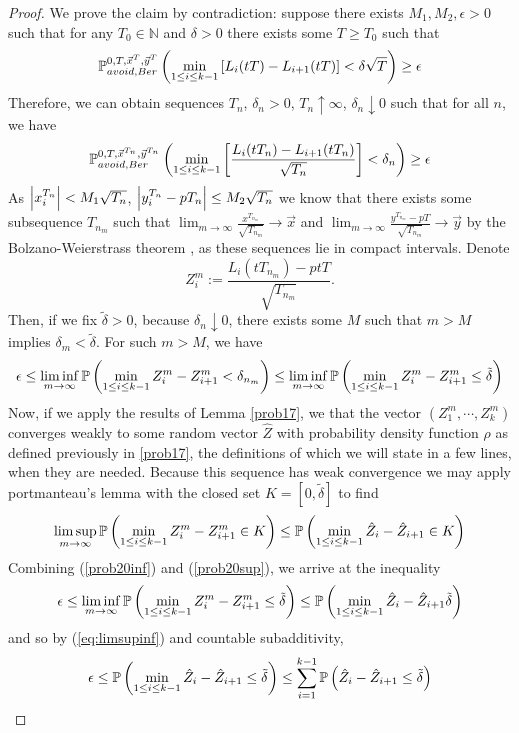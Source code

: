 \begin{proof}
	We prove the claim by contradiction:
	suppose there exists $M_1,M_2,\epsilon>0$ such that for any $T_0\in \mathbb{N}$ and $\delta>0$ there exists some $T\geq T_0$ such that \[
	\pr^{0,T,\vec x^T,\vec y^T}_{avoid, Ber}\left(\min_{1\leq i\leq k-1}\left[L_i(tT)-L_{i+1}(tT)\right]<\delta\sqrt{T}\right)\geq \epsilon
	\]
	Therefore, we can obtain sequences $T_n$, $\delta_n>0$, $T_n\uparrow \infty$, $\delta_n\downarrow 0$ such that for all $n$, we have  
	\[
	\pr^{0,T,\vec x^{T_n},\vec y^{T_n}}_{avoid, Ber}\left(\min_{1\leq i\leq k-1}\left[\frac{L_i(tT_n)-L_{i+1}(tT_n)}{\sqrt{T_n}}\right]<\delta_n\right)\geq \epsilon
	\]
	As $\abs*{x_i^{T_n}}<M_1\sqrt{T_n}$, $\abs*{y_i^{T_n}-pT_n}\leq M_2\sqrt{T_n}$ we know that there exists some subsequence $T_{n_m}$ such that $\lim_{m\to\infty} \frac{x^{T_{n_m}}}{\sqrt{T_{n_m}}}\to \vec x$ 
	and 
	$\lim_{m\to\infty}\frac{y^{T_{n_m}}-pT}{\sqrt{T_{n_m}}}\to \vec y$ 
	by the Bolzano-Weierstrass theorem \cite[Theorem 3.6]{Rudin}, as these sequences lie in compact intervals. Denote $$Z_i^m:=\frac{L_i(tT_{n_m})-ptT}{\sqrt{T_{n_m}}}.$$ Then, if we fix $\tilde\delta>0$, because $\delta_n\downarrow 0$, there exists some $M$ such that $m>M$ implies $\delta_m<\tilde\delta$. For such $m>M$, we have 
	\begin{equation}\label{prob20inf}
	\epsilon\leq \liminf_{m\to\infty}\pr\left(\min_{1\leq i\leq k-1}Z_i^m-Z_{i+1}^m<\delta_{n_m}\right)\leq \liminf_{m\to\infty}\pr\left(\min_{1\leq i\leq k-1}Z_i^m-Z_{i+1}^m\leq\tilde\delta\right)
	\end{equation}
	Now, if we apply the results of Lemma \ref{prob17}, we that the vector $(Z_1^m,\cdots, Z_k^m)$ converges weakly to some random vector $\hat Z$ with probability density function $\rho$ as defined previously in \ref{prob17}, the definitions of which we will state in a few lines, when  they are needed.
	Because this sequence has weak convergence we may apply portmanteau's lemma with the closed set $K=[0,\tilde\delta]$ to find 
	\begin{equation}\label{prob20sup}
	\limsup_{m\to\infty }\pr\left(\min_{1\leq i\leq k-1}Z_i^m-Z_{i+1}^m\in K\right)\leq \pr\left(\min_{1\leq i\leq k-1}\hat Z_i-\hat Z_{i+1}\in K\right)
	\end{equation}
	Combining (\ref{prob20inf}) and (\ref{prob20sup}), we arrive at the inequality
	\begin{equation}\label{eq:limsupinf}
	\epsilon\leq \liminf_{m\to\infty}\pr\left(\min_{1\leq i\leq k-1} Z_i^m-Z_{i+1}^m\leq \tilde\delta\right)\leq \pr\left(\min_{1\leq i\leq k-1} \hat Z_i-\hat Z_{i+1}\tilde\delta\right)
	\end{equation}
	and so by (\ref{eq:limsupinf}) and countable subadditivity,
	\begin{equation}\label{eq:ineq}
	\epsilon\leq \pr\left(\min_{1\leq i\leq k-1} \hat Z_i-\hat Z_{i+1}\leq\tilde\delta\right)\leq \sum_{i=1}^{k-1}\pr\left(\hat Z_i-\hat Z_{i+1}\leq \tilde\delta\right)
	\end{equation}
	

\end{proof}

